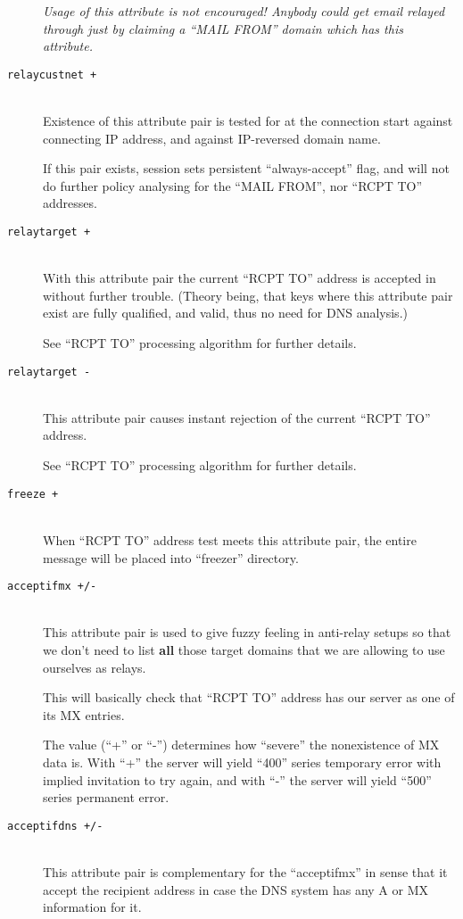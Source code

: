 \begin{description}
{\em Usage of this attribute is not encouraged!
Anybody could get email relayed through just by claiming
a ``MAIL FROM'' domain which has this attribute.}

\item[\tt relaycustnet +] \mbox{} \\
Existence of this attribute pair is tested for at the  connection
start against connecting IP address, and against IP-reversed domain name.

If this pair exists, session sets persistent ``always-accept'' flag,
and will not do further policy analysing for the ``MAIL FROM'', nor
``RCPT TO'' addresses.

\item[\tt relaytarget +] \mbox{} \\
With this attribute pair the current ``RCPT TO'' address is accepted in
without further trouble. (Theory being, that keys where this attribute
pair exist are fully qualified, and valid, thus no need for DNS analysis.)

See ``RCPT TO'' processing algorithm for further details.

\item[\tt relaytarget -] \mbox{} \\
This attribute pair causes instant rejection of the current ``RCPT TO''
address.

See ``RCPT TO'' processing algorithm for further details.

\item[\tt freeze +] \mbox{} \\
When ``RCPT TO'' address test meets this attribute pair, the entire
message will be placed into ``freezer'' directory.

\item[\tt acceptifmx +/-] \mbox{} \\
This attribute pair is used to give fuzzy feeling in anti-relay setups
so that we don't need to list {\bf all} those target domains that we
are allowing to use ourselves as relays.

This will basically check that ``RCPT TO'' address has our server
as one of its MX entries.

The value (``+'' or ``-'') determines how ``severe'' the nonexistence
of MX data is.  With ``+'' the server will yield ``400'' series temporary
error with implied invitation to try again, and with ``-'' the server will
yield ``500'' series permanent error.

\item[\tt acceptifdns +/-] \mbox{} \\
This attribute pair is complementary for the ``acceptifmx'' in sense
that it accept the recipient address in case the DNS system has any
A or MX information for it.


\end{description}

